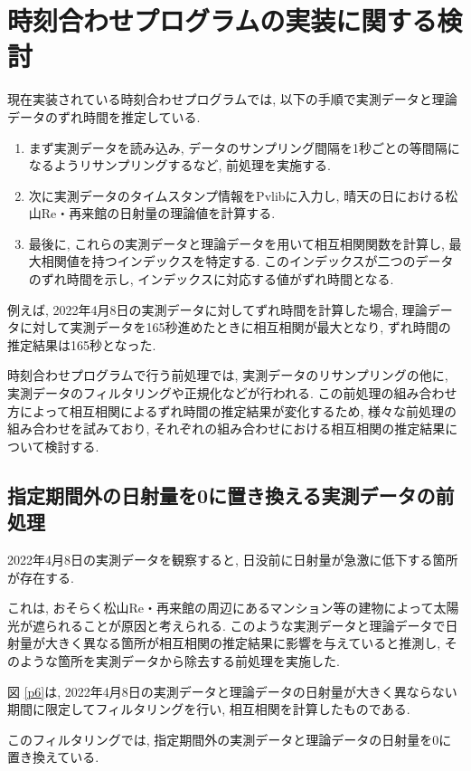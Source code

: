 \documentclass[a4j,12pt,]{jarticle}
\begin{document}
\section{時刻合わせプログラムの実装に関する検討}
現在実装されている時刻合わせプログラムでは, 以下の手順で実測データと理論データのずれ時間を推定している. 

\begin{enumerate}
\item まず実測データを読み込み, データのサンプリング間隔を1秒ごとの等間隔になるようリサンプリングするなど, 前処理を実施する. 
\item 次に実測データのタイムスタンプ情報をPvlibに入力し, 晴天の日における松山Re・再来館の日射量の理論値を計算する. 
\item 最後に, これらの実測データと理論データを用いて相互相関関数を計算し, 最大相関値を持つインデックスを特定する. このインデックスが二つのデータのずれ時間を示し, インデックスに対応する値がずれ時間となる. 
\end{enumerate}

例えば, 2022年4月8日の実測データに対してずれ時間を計算した場合, 理論データに対して実測データを165秒進めたときに相互相関が最大となり, ずれ時間の推定結果は165秒となった. 

時刻合わせプログラムで行う前処理では, 実測データのリサンプリングの他に, 実測データのフィルタリングや正規化などが行われる. この前処理の組み合わせ方によって相互相関によるずれ時間の推定結果が変化するため, 様々な前処理の組み合わせを試みており, それぞれの組み合わせにおける相互相関の推定結果について検討する. 

\subsection{指定期間外の日射量を0に置き換える実測データの前処理}
2022年4月8日の実測データを観察すると, 日没前に日射量が急激に低下する箇所が存在する. 

これは, おそらく松山Re・再来館の周辺にあるマンション等の建物によって太陽光が遮られることが原因と考えられる. このような実測データと理論データで日射量が大きく異なる箇所が相互相関の推定結果に影響を与えていると推測し, そのような箇所を実測データから除去する前処理を実施した. 

図 \ref{p6}は, 2022年4月8日の実測データと理論データの日射量が大きく異ならない期間に限定してフィルタリングを行い, 相互相関を計算したものである. 

このフィルタリングでは, 指定期間外の実測データと理論データの日射量を0に置き換えている. 
\end{document}
